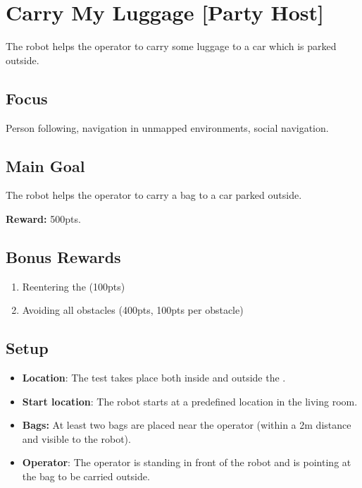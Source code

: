 \section{Carry My Luggage [Party Host]}
\label{test:carry-my-luggage}
The robot helps the operator to carry some luggage to a car which is parked outside.

\subsection*{Focus}
Person following, navigation in unmapped environments, social navigation.

\subsection*{Main Goal}
The robot helps the operator to carry a bag to a car parked outside.

\noindent\textbf{Reward:} 500pts.

\subsection*{Bonus Rewards}
\begin{enumerate}[nosep]
	\item Reentering the \Arena{} (100pts)
	\item Avoiding all obstacles (400pts, 100pts per obstacle)
\end{enumerate}


\subsection*{Setup}
\begin{itemize}[nosep]
	\item \textbf{Location}: The test takes place both inside and outside the \Arena{}.
	\item \textbf{Start location}: The robot starts at a predefined location in the living room.
	\item \textbf{Bags:} At least two bags are placed near the operator (within a 2m distance and visible to the robot).
	\item \textbf{Operator}: The operator is standing in front of the robot and is pointing at the bag to be carried outside.
\end{itemize}

